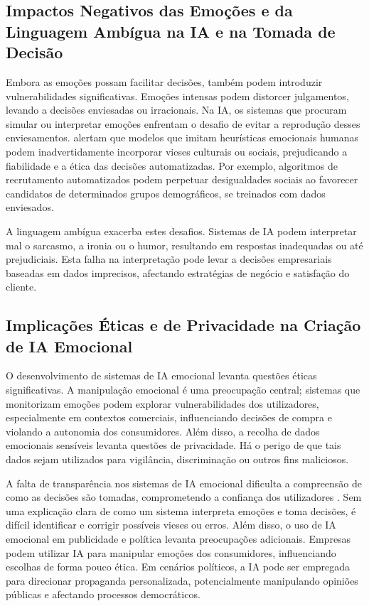 \documentclass[a4paper,12pt]{report}
\begin{document}
	\subsection{Impactos Negativos das Emoções e da Linguagem Ambígua na IA e na Tomada de Decisão}
	
	Embora as emoções possam facilitar decisões, também podem introduzir vulnerabilidades significativas. Emoções intensas podem distorcer julgamentos, levando a decisões enviesadas ou irracionais. Na IA, os sistemas que procuram simular ou interpretar emoções enfrentam o desafio de evitar a reprodução desses enviesamentos. \textcite{russell2020} alertam que modelos que imitam heurísticas emocionais humanas podem inadvertidamente incorporar vieses culturais ou sociais, prejudicando a fiabilidade e a ética das decisões automatizadas. Por exemplo, algoritmos de recrutamento automatizados podem perpetuar desigualdades sociais ao favorecer candidatos de determinados grupos demográficos, se treinados com dados enviesados.
	
	A linguagem ambígua exacerba estes desafios. Sistemas de IA podem interpretar mal o sarcasmo, a ironia ou o humor, resultando em respostas inadequadas ou até prejudiciais. Esta falha na interpretação pode levar a decisões empresariais baseadas em dados imprecisos, afectando estratégias de negócio e satisfação do cliente.
	
	\subsection{Implicações Éticas e de Privacidade na Criação de IA Emocional}
	
	O desenvolvimento de sistemas de IA emocional levanta questões éticas significativas. A manipulação emocional é uma preocupação central; sistemas que monitorizam emoções podem explorar vulnerabilidades dos utilizadores, especialmente em contextos comerciais, influenciando decisões de compra e violando a autonomia dos consumidores. Além disso, a recolha de dados emocionais sensíveis levanta questões de privacidade. Há o perigo de que tais dados sejam utilizados para vigilância, discriminação ou outros fins maliciosos.
	
	A falta de transparência nos sistemas de IA emocional dificulta a compreensão de como as decisões são tomadas, comprometendo a confiança dos utilizadores \parencite{russell2020}. Sem uma explicação clara de como um sistema interpreta emoções e toma decisões, é difícil identificar e corrigir possíveis vieses ou erros. Além disso, o uso de IA emocional em publicidade e política levanta preocupações adicionais. Empresas podem utilizar IA para manipular emoções dos consumidores, influenciando escolhas de forma pouco ética. Em cenários políticos, a IA pode ser empregada para direcionar propaganda personalizada, potencialmente manipulando opiniões públicas e afectando processos democráticos.
	
\end{document}
